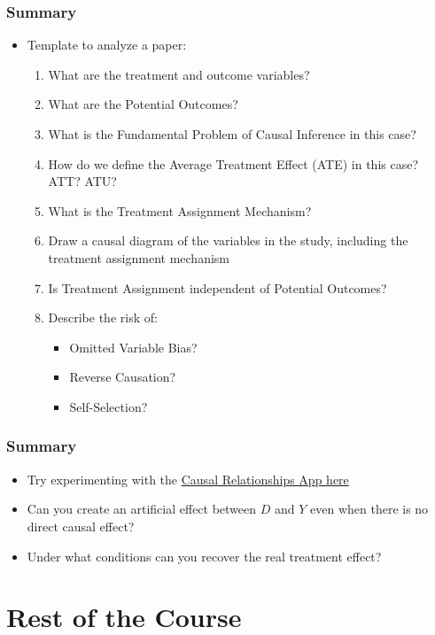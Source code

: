 \documentclass[xcolor=x11names,compress]{beamer}\usepackage[]{graphicx}\usepackage[]{color}
\renewcommand{\(}{\begin{columns}}
\renewcommand{\)}{\end{columns}}
\newcommand{\<}[1]{\begin{column}{#1}}
\renewcommand{\>}{\end{column}}
\begin{document}
\begin{frame}
\frametitle{Summary}
\begin{itemize}
\item Template to analyze a paper:
\begin{enumerate}
\item What are the treatment and outcome variables?
\pause
\item What are the Potential Outcomes?
\pause
\item What is the Fundamental Problem of Causal Inference in this case?
\pause
\item How do we define the Average Treatment Effect (ATE) in this case? ATT? ATU?
\pause
\item What is the Treatment Assignment Mechanism?
\pause
\item Draw a causal diagram of the variables in the study, including the treatment assignment mechanism
\pause
\item Is Treatment Assignment independent of Potential Outcomes?
\pause
\item Describe the risk of:
\begin{itemize}
\item Omitted Variable Bias?
\pause
\item Reverse Causation?
\pause
\item Self-Selection?
\end{itemize}
\end{enumerate}
\end{itemize}
\end{frame}



\begin{frame}
\frametitle{Summary}
\begin{itemize}
\item Try experimenting with the \href{https://poliong.shinyapps.io/DAGs/}{Causal Relationships App here}
\pause
\item Can you create an artificial effect between $D$ and $Y$ even when there is no direct causal effect?
\pause
\item Under what conditions can you recover the real treatment effect?
\end{itemize}
\end{frame}

\section{Rest of the Course}
\end{document}
